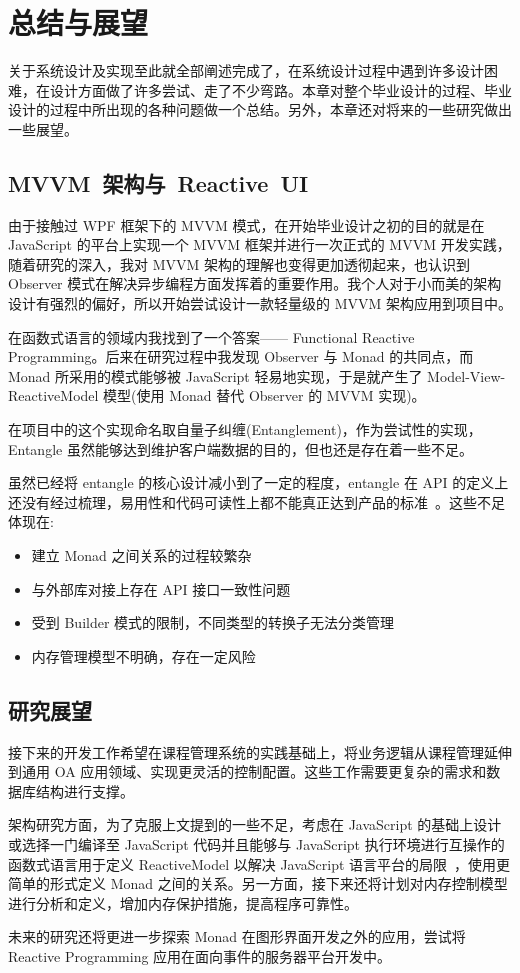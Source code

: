 \chapter{总结与展望}

关于系统设计及实现至此就全部阐述完成了，在系统设计过程中遇到许多设计困难，在设计方面做了许多尝试、走了不少弯路。本章对整个毕业设计的过程、毕业设计的过程中所出现的各种问题做一个总结。另外，本章还对将来的一些研究做出一些展望。

\section{MVVM~架构与~Reactive~UI}

由于接触过 WPF 框架下的 MVVM 模式，在开始毕业设计之初的目的就是在 JavaScript 的平台上实现一个 MVVM 框架并进行一次正式的 MVVM 开发实践，随着研究的深入，我对 MVVM 架构的理解也变得更加透彻起来，也认识到 Observer 模式在解决异步编程方面发挥着的重要作用。我个人对于小而美的架构设计有强烈的偏好，所以开始尝试设计一款轻量级的 MVVM 架构应用到项目中。

在函数式语言的领域内我找到了一个答案—— Functional Reactive Programming。后来在研究过程中我发现 Observer 与 Monad 的共同点，而 Monad 所采用的模式能够被 JavaScript 轻易地实现，于是就产生了 Model-View-ReactiveModel 模型(使用 Monad 替代 Observer 的 MVVM 实现)。

在项目中的这个实现命名取自量子纠缠(Entanglement)，作为尝试性的实现，Entangle 虽然能够达到维护客户端数据的目的，但也还是存在着一些不足。

虽然已经将 entangle 的核心设计减小到了一定的程度，entangle 在 API 的定义上还没有经过梳理，易用性和代码可读性上都不能真正达到产品的标准~\cite{Gerken:2010:UCM:1753846.1754082}。这些不足体现在:

\begin{itemize}
  \item 建立 Monad 之间关系的过程较繁杂
  \item 与外部库对接上存在 API 接口一致性问题
  \item 受到 Builder 模式的限制，不同类型的转换子无法分类管理
  \item 内存管理模型不明确，存在一定风险
\end{itemize}

\section{研究展望}

接下来的开发工作希望在课程管理系统的实践基础上，将业务逻辑从课程管理延伸到通用 OA 应用领域、实现更灵活的控制配置。这些工作需要更复杂的需求和数据库结构进行支撑。

架构研究方面，为了克服上文提到的一些不足，考虑在 JavaScript 的基础上设计或选择一门编译至 JavaScript 代码并且能够与 JavaScript 执行环境进行互操作的函数式语言用于定义 ReactiveModel 以解决 JavaScript 语言平台的局限~\cite{Freeman:2012:HLW:2480361.2371413}，使用更简单的形式定义 Monad 之间的关系。另一方面，接下来还将计划对内存控制模型进行分析和定义，增加内存保护措施，提高程序可靠性。

未来的研究还将更进一步探索 Monad 在图形界面开发之外的应用，尝试将 Reactive Programming 应用在面向事件的服务器平台开发中。

